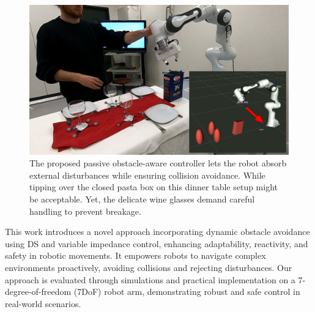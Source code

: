 \begin{figure}
\centerline{\includegraphics[width=.7\columnwidth]{figures/robot_arm_table_avoidance}}
\caption{
The proposed passive obstacle-aware controller lets the robot absorb external disturbances while ensuring collision avoidance. 
While tipping over the closed pasta box on this dinner table setup might be acceptable. Yet, the delicate wine glasses demand careful handling to prevent breakage.
}
\label{fig:table_avoidance_with_obstacle}
\end{figure}

This work introduces a novel approach incorporating dynamic obstacle avoidance using DS and variable impedance control, enhancing adaptability, reactivity, and safety in robotic movements. It empowers robots to navigate complex environments proactively, avoiding collisions and rejecting disturbances. Our approach is evaluated through simulations and practical implementation on a 7-degree-of-freedom (7DoF) robot arm, demonstrating robust and safe control in real-world scenarios.

